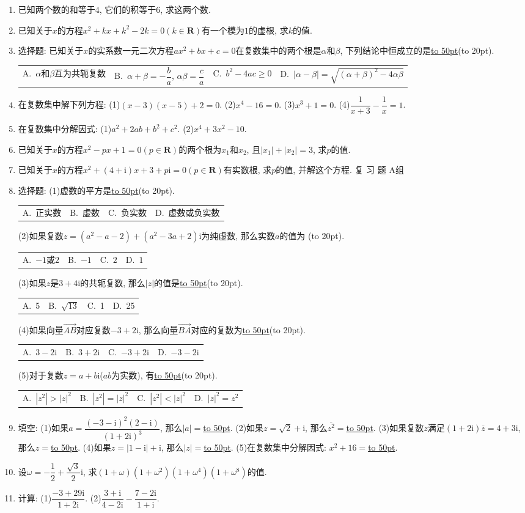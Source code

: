 \documentclass[10pt,a4paper]{article}
\newcommand{\blank}[1]{\underline{\hbox to #1pt{}}}
\newcommand{\bracket}[1]{(\hbox to #1pt{})}
\newcommand{\fourch}[4]{\par\begin{tabular}{p{.23\textwidth}p{.23\textwidth}p{.23\textwidth}p{.23\textwidth}}
A.~#1 &B.~#2& C.~#3& D.~#4
\end{tabular}}
\begin{document}
\begin{enumerate}[1.]
\item 已知两个数的和等于$4$, 它们的积等于$6$, 求这两个数.
\item 已知关于$x$的方程$x^2+kx+k^2-2k=0(k\in \mathbf{R})$有一个模为$1$的虚根, 求$k$的值.
\item 选择题:
已知关于$x$的实系数一元二次方程$ax^2+bx+c=0$在复数集中的两个根是$\alpha$和$\beta$, 下列结论中恒成立的是\blank{50}\bracket{20}.
\fourch{$\alpha$和$\beta$互为共轭复数}{$\alpha +\beta =-\dfrac ba$, $\alpha \beta =\dfrac ca$}{$b^2-4ac\ge 0$}{$|\alpha -\beta|=\sqrt {(\alpha +\beta)^2-4\alpha \beta }$}
\item 在复数集中解下列方程:
(1)$(x-3)(x-5)+2=0$.				(2)$x^4-16=0$.
(3)$x^3+1=0$.							(4)$\dfrac 1{x+3}-\dfrac 1x=1$.
\item 在复数集中分解因式:
(1)$a^2+2ab+b^2+c^2$.					(2)$x^4+3x^2-10$.
\item 已知关于$x$的方程$x^2-px+1=0(p\in \mathbf{R})$的两个根为$x_1$和$x_2$, 且$|x_1|+|x_2|=3$, 求$p$的值.
\item 已知关于$x$的方程$x^2+(4+\mathrm{i})x+3+p\mathrm{i}=0(p\in \mathbf{R})$有实数根, 求$p$的值, 并解这个方程.
复 习 题
A组
\item 选择题:
(1)虚数的平方是\blank{50}\bracket{20}.
\fourch{正实数}{虚数}{负实数}{虚数或负实数}
(2)如果复数$z=(a^2-a-2)+(a^2-3a+2)\mathrm{i}$为纯虚数, 那么实数$a$的值为    \bracket{20}.
\fourch{$-1$或$2$}{$-1$}{$2$}{$1$}
(3)如果$z$是$3+4\mathrm{i}$的共轭复数, 那么$|z|$的值是\blank{50}\bracket{20}.
\fourch{5}{$\sqrt {13}$}{1}{25}
(4)如果向量$\overrightarrow{AB}$对应复数$-3+2\mathrm{i}$, 那么向量$\overrightarrow{BA}$对应的复数为\blank{50}\bracket{20}.
\fourch{$3-2\mathrm{i}$}{$3+2\mathrm{i}$}{$-3+2\mathrm{i}$}{$-3-2\mathrm{i}$}
(5)对于复数$z=a+b\mathrm{i}$($ab$为实数), 有\blank{50}\bracket{20}.
\fourch{$|z^2|>|z|^2$}{$|z^2|=|z|^2$}{$|z^2|<|z|^2$}{$|z|^2=z^2$}
\item 填空:
(1)如果$a=\dfrac{{{(-3-\mathrm{i})}^2}(2-\mathrm{i})}{{{(1+2\mathrm{i})}^3}}$, 那么$|a|=$\blank{50}.
(2)如果$z=\sqrt 2+\mathrm{i}$, 那么$\overline {z^2}=$\blank{50}.
(3)如果复数$z$满足$(1+2\mathrm{i})\overline  z=4+3\mathrm{i}$, 那么$z=$\blank{50}.
(4)如果$z=|1-\mathrm{i}|+\mathrm{i}$, 那么$|z|=$\blank{50}.
(5)在复数集中分解因式: $x^2+16=$\blank{50}.
\item 设$\omega =-\dfrac 12+\dfrac{\sqrt 3}2\mathrm{i}$, 求$(1+\omega)(1+\omega ^2)(1+\omega ^4)(1+\omega ^8)$的值.
\item 计算:
(1)$\dfrac{-3+29\mathrm{i}}{1+2\mathrm{i}}$.							(2)$\dfrac{3+\mathrm{i}}{4-2\mathrm{i}}-\dfrac{7-2\mathrm{i}}{1+\mathrm{i}}$.

\end{enumerate}
\end{document}
